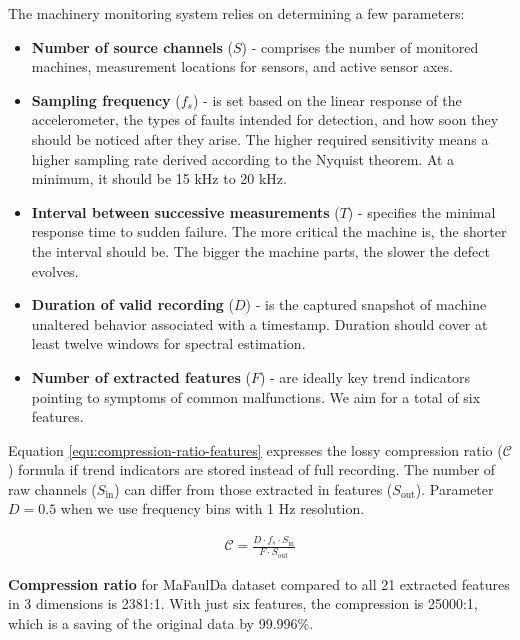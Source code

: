 The machinery monitoring system relies on determining a few parameters:
\begin{itemize}
\itemsep0pt
\item \textbf{Number of source channels} ($S$) - comprises the number of monitored machines, measurement locations for sensors, and active sensor axes.
\item \textbf{Sampling frequency} ($f_s$) - is set based on the linear response of the accelerometer, the types of faults intended for detection, and how soon they should be noticed after they arise. The higher required sensitivity means a higher sampling rate derived according to the Nyquist theorem. At a minimum, it should be 15 kHz to 20 kHz.
\item \textbf{Interval between successive measurements} ($T$) - specifies the minimal response time to sudden failure. The more critical the machine is, the shorter the interval should be. The bigger the machine parts, the slower the defect evolves.
\item \textbf{Duration of valid recording} ($D$) - is the captured snapshot of machine unaltered behavior associated with a timestamp. Duration should cover at least twelve windows for spectral estimation.
\item \textbf{Number of extracted features} ($F$) - are ideally key trend indicators pointing to symptoms of common malfunctions. We aim for a total of six features.
\end{itemize}

Equation \ref{equ:compression-ratio-features} expresses the lossy compression ratio ($\mathcal{C}$) formula if trend indicators are stored instead of full recording. The number of raw channels ($S_{\mathrm{in}}$) can differ from those extracted in features ($S_{\mathrm{out}}$). Parameter $D = 0.5$ when we use frequency bins with 1 Hz resolution.

\begin{ceqn}\begin{align} \label{equ:compression-ratio-features}
\mathcal{C} = \frac{D \cdot f_s \cdot S_{\mathrm{in}}}{F \cdot S_{\mathrm{out}}}
\end{align}\end{ceqn}

\textbf{Compression ratio} for MaFaulDa dataset compared to all 21 extracted features in 3 dimensions is 2381:1. With just six features, the compression is 25000:1, which is a saving of the original data by 99.996\%.


